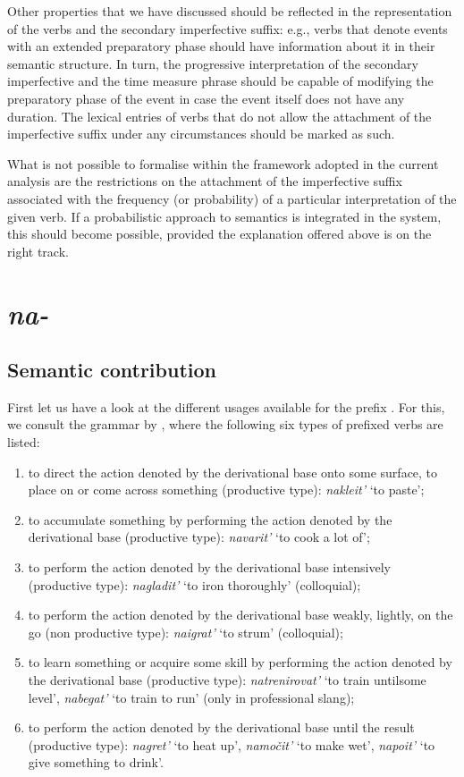 Other properties that we have discussed should be reflected in the representation of the verbs and the secondary imperfective suffix: e.g., verbs that denote events with an extended preparatory phase should have information about it in their semantic structure. In turn, the progressive interpretation of the secondary imperfective and the time measure phrase should be capable of modifying the preparatory phase of the event in case the event itself does not have any duration. The lexical entries of verbs that do not allow the attachment of the imperfective suffix under any circumstances should be marked as such.

What is not possible to formalise within the framework adopted in the current analysis are the restrictions on the attachment of the imperfective suffix associated with the frequency (or probability) of a particular interpretation of the given verb. If a probabilistic approach to semantics is integrated in the system, this should become possible, provided the explanation offered above is on the right track.

\section{\textit{na-}}\label{subsection:semantics:na}
\subsection{Semantic contribution}
First let us have a look at the different usages available for the prefix . For this, we consult the grammar by \citet[360]{Shvedova:82}, where the following six types of prefixed verbs are listed:
\begin{enumerate}
\item to direct the action denoted by the derivational base onto some surface, to place on or come across something (productive type): \textit{nakleit'} `to paste';
\item to accumulate something by performing the action denoted by the derivational base (productive type): \textit{navarit'} `to cook a lot of';
\item to perform the action denoted by the derivational base intensively (productive type): \textit{nagladit'} `to iron thoroughly' (colloquial);
\item to perform the action denoted by the derivational base weakly, lightly, on the go (non productive type): \textit{naigrat'} `to strum' (colloquial);
\item to learn something or acquire some skill by performing the action denoted by the derivational base (productive type): \textit{natrenirovat'} `to train until\linebreak some level', \textit{nabegat'} `to train to run' (only in professional slang);
\item to perform the action denoted by the derivational base until the result (productive type): \textit{nagret'} `to heat up', \textit{namo\v{c}it'} `to make wet', \textit{napoit'} `to give something to drink'.
\end{enumerate}

